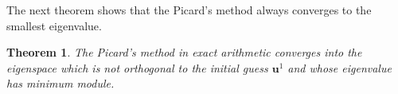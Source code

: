 \documentclass[preprint,12pt]{elsarticle}
\newtheorem{theorem}{Theorem}[section]
\newtheorem{lemma}[theorem]{Lemma}
\begin{document}



The next theorem shows that the Picard's method always converges to the smallest eigenvalue.

\begin{theorem}\label{th:picard_conv}
The Picard's method in exact arithmetic converges into the eigenspace which is not orthogonal to the initial guess $\mathbf{u}^1$ and whose eigenvalue has minimum module.
\end{theorem}
\end{document}
